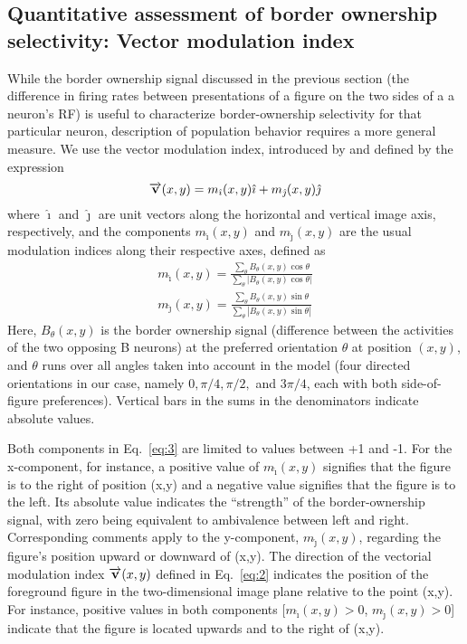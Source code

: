 \subsection{Quantitative assessment of border ownership selectivity:  Vector modulation index}
\label{sec:vmi}
While the border ownership signal discussed in the previous
section (the difference in firing rates between presentations of a figure
on the two sides of a a neuron's RF) is useful to
characterize border-ownership selectivity for that particular neuron,
description of population behavior requires a more general measure. We
use the vector modulation index, introduced by \cite{Craft_etal07} and defined
by the expression 
\begin{equation}
\label{eq:2}
\overrightarrow{\mathbf{v}}(x,y) = m_{\hat{\imath}}(x,y)\hat{\imath} + m_{\hat{\jmath}}(x,y)\hat{\jmath}
\end{equation}
where $\hat{\imath}$ and $\hat{\jmath}$ are unit vectors along the horizontal and vertical image
axis, respectively, and the components $m_{\hat{\imath}}(x,y)$ and $m_{\hat{\jmath}}(x,y)$ are the usual modulation indices along their respective axes, defined as
\begin{equation}
\label{eq:3}
\begin{split}
	m_{\hat{\imath}}(x,y) = \frac{\sum_{\theta}
        B_{\theta}(x,y)\cos\theta}{\sum_{\theta}
                \left|B_{\theta}(x,y)\cos\theta\right|} \\
	m_{\hat{\jmath}}(x,y) = \frac{\sum_{\theta}
        B_{\theta}(x,y)\sin\theta}{\sum_{\theta}
                \left|B_{\theta}(x,y)\sin\theta\right|}
\end{split}
\end{equation}
Here, $B_{\theta}(x,y)$ is the border ownership signal (difference between
the activities of the two opposing B neurons) at the preferred
orientation $\theta$ at position $(x,y)$, and $\theta$ runs over all
angles taken into account in the model 
(four directed orientations in our case, namely $0, \pi/4, \pi/2,$
and $3\pi/4$, each with both side-of-figure preferences). 
Vertical bars in the sums in the denominators indicate absolute values.

Both components in Eq.~\ref{eq:3} are limited to values between +1 and
-1. For the x-component, for instance, a positive value of
$m_{\hat{\imath}}(x,y)$ signifies that the figure is to the right of
position (x,y) and a negative value signifies that the figure is to
the left. Its absolute value indicates the ``strength'' of the
border-ownership signal, with zero being equivalent to ambivalence
between left and right. Corresponding comments apply to the
y-component, $m_{\hat{\jmath}}(x,y)$, regarding the figure's position
upward or downward of (x,y). The direction of the vectorial modulation
index $\overrightarrow{\mathbf{v}}(x,y)$ 
defined in Eq.~\ref{eq:2} indicates the position
of the foreground figure in the two-dimensional image plane relative
to the point (x,y). For instance, positive values in both components
[$m_{\hat{\imath}}(x,y) > 0$, $m_{\hat{\jmath}}(x,y) > 0$] indicate
that the figure is located upwards and to the right of (x,y).

